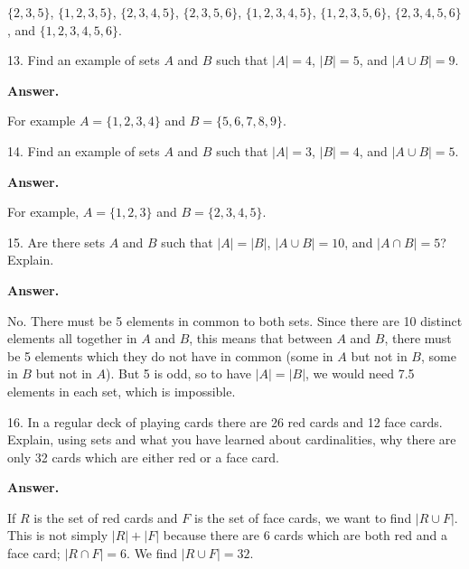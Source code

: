 \documentclass[10pt,]{book}
\theoremstyle{plain}
\theoremstyle{definition}
\theoremstyle{definition}
\theoremstyle{definition}
\numberwithin{equation}{section}
\begin{document}
\begin{exerciselist}
            \(\{2,3,5\}\), \(\{1,2,3,5\}\), \(\{2,3,4,5\}\), \(\{2,3,5,6\}\), \(\{1,2,3,4,5\}\), \(\{1,2,3,5,6\}\), \(\{2,3,4,5,6\}\), and \(\{1,2,3,4,5,6\}\).
\item[13.]\hypertarget{exercise-13}{}
            Find an example of sets \(A\) and \(B\) such that \(|A| = 4\), \(|B| = 5\), and \(|A \cup B| = 9\).
\par\smallskip
\par\smallskip
\noindent\textbf{Answer.}\hypertarget{answer-13}{}\quad

            For example \(A = \{1,2,3,4\}\) and \(B = \{5,6,7,8,9\}\).
\item[14.]\hypertarget{exercise-14}{}
            Find an example of sets \(A\) and \(B\) such that \(|A| = 3\), \(|B| = 4\), and \(|A \cup B| = 5\).
\par\smallskip
\par\smallskip
\noindent\textbf{Answer.}\hypertarget{answer-14}{}\quad

            For example, \(A = \{1,2,3\}\) and \(B = \{2,3,4,5\}\).
\item[15.]\hypertarget{exercise-15}{}
            Are there sets \(A\) and \(B\) such that \(|A| = |B|\), \(|A\cup B| = 10\), and \(|A\cap B| = 5\)? Explain.
\par\smallskip
\par\smallskip
\noindent\textbf{Answer.}\hypertarget{answer-15}{}\quad

            No. There must be 5 elements in common to both sets. Since there are 10 distinct elements all together in \(A\) and \(B\), this means that between \(A\) and \(B\), there must be 5 elements which they do not have in common (some
            in \(A\) but not in \(B\), some in \(B\) but not in \(A\)). But 5 is odd, so to have \(|A| = |B|\), we would need 7.5 elements in each set, which is impossible.
\item[16.]\hypertarget{exercise-16}{}
            In a regular deck of playing cards there are 26 red cards and 12 face cards. Explain, using sets and what you have learned about cardinalities, why there are only 32 cards which are either red or a face card.
\par\smallskip
\par\smallskip
\noindent\textbf{Answer.}\hypertarget{answer-16}{}\quad

            If \(R\) is the set of red cards and \(F\) is the set of face cards, we want to find \(|R \cup F|\). This is not simply \(|R| + |F|\) because there are 6 cards which are both red and a face card; \(|R \cap F| = 6\). We find
            \(|R \cup F| = 32\).
\end{exerciselist}
\typeout{************************************************}
\typeout{************************************************}
\end{document}
